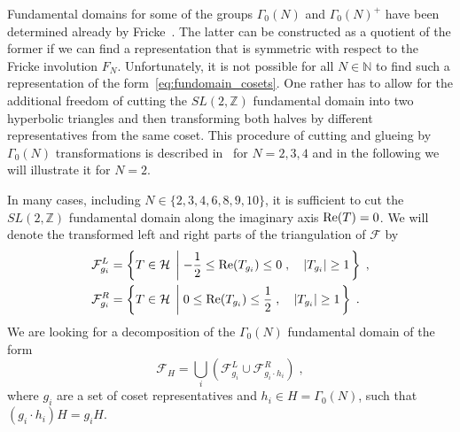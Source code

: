 \documentclass[11pt,a4paper]{article}
\numberwithin{equation}{section}
\numberwithin{table}{section}\setlength{\multlinegap}{25pt}
\begin{document}
Fundamental domains for some of the groups $\Gamma_0(N)$ and $\Gamma_0(N)^+$ have been determined already by Fricke~\cite{fricke1922elliptischen,FrickeSpringer1,FrickeSpringer2,FrickeSpringer3}. The latter can be constructed as a quotient of the former if we can find a representation that is symmetric with respect to the Fricke involution $F_N$. Unfortunately, it is not possible for all $N\in\mathbb{N}$ to find such a representation of the form~\eqref{eq:fundomain_cosets}. One rather has to allow for the additional freedom of cutting the $SL(2,\mathbb{Z})$ fundamental domain into two hyperbolic triangles and then transforming both halves by different representatives from the same coset. This procedure of cutting and glueing by $\Gamma_0(N)$ transformations is described in~\cite{BayerTravesa:2007} for $N=2,3,4$ and in the following we will illustrate it for $N=2$.

In many cases, including $N\in\{2,3,4,6,8,9,10\}$, it is sufficient to cut the $SL(2,\mathbb{Z})$ fundamental domain along the imaginary axis $\textup{Re}(T)=0$. We will denote the transformed left and right parts of the triangulation of $\mathcal{F}$ by
\begin{equation}
    \begin{aligned}
        \mathcal{F}^L_{g_i}&=\left\{ T\in\mathcal{H} \;\left|\;-\frac12\leq\textup{Re}(T_{g_i})\leq 0\;,\quad |T_{g_i}|\geq1\right.\right\}\;,\\
        \mathcal{F}^R_{g_i}&=\left\{ T\in\mathcal{H} \;\left|\;0\leq\textup{Re}(T_{g_i})\leq \frac12\;,\quad |T_{g_i}|\geq1\right.\right\}\;.
    \end{aligned}
\end{equation}
We are looking for a decomposition of the $\Gamma_0(N)$ fundamental domain of the form
\begin{equation}
    \mathcal{F}_H=\bigcup_i\left( \mathcal{F}^L_{g_i} \cup \mathcal{F}^R_{g_i\cdot h_i} \right)\;,
\end{equation}
where $g_i$ are a set of coset representatives and $h_i\in H=\Gamma_0(N)$, such that $(g_i\cdot h_i) H=g_iH$.
\end{document}

